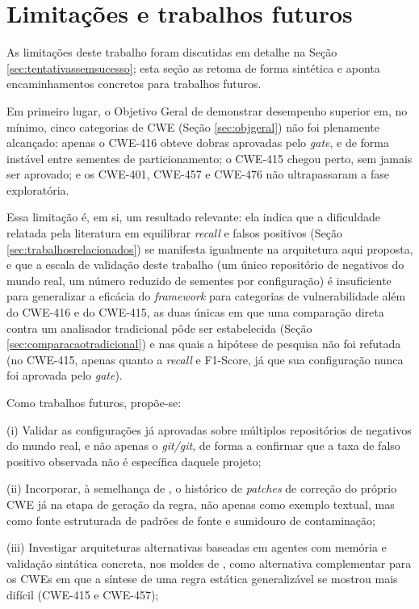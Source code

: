 \documentclass[
    12pt,                %
    openright,           %
    oneside,             %
    a4paper,             %
    english,             %
    brazil               %
]{abntex2}
\newcommand{\novo}[1]{{\color{red}#1}}
\begin{document}
\section{Limitações e trabalhos futuros}
\par
As limitações deste trabalho foram discutidas em detalhe na Seção \ref{sec:tentativassemsucesso}; esta seção as retoma de forma sintética e aponta encaminhamentos concretos para trabalhos futuros.
\par
Em primeiro lugar, o Objetivo Geral de demonstrar desempenho superior em, no mínimo, cinco categorias de CWE (Seção \ref{sec:objgeral}) não foi plenamente alcançado: apenas o CWE-416 obteve dobras aprovadas pelo \textit{gate}, e de forma instável entre sementes de particionamento; o CWE-415 chegou perto, sem jamais ser aprovado; e os CWE-401, CWE-457 e CWE-476 não ultrapassaram a fase exploratória.
\par
Essa limitação é, em si, um resultado relevante: ela indica que a dificuldade relatada pela literatura em equilibrar \textit{recall} e falsos positivos (Seção \ref{sec:trabalhosrelacionados}) se manifesta igualmente na arquitetura aqui proposta, e que a escala de validação deste trabalho (um único repositório de negativos do mundo real, um número reduzido de sementes por configuração) é insuficiente para generalizar a eficácia do \textit{framework} para categorias de vulnerabilidade além do CWE-416 e do CWE-415, as duas únicas em que uma comparação direta contra um analisador tradicional pôde ser estabelecida (Seção \ref{sec:comparacaotradicional}) e nas quais a hipótese de pesquisa não foi refutada\novo{ (no CWE-415, apenas quanto a \textit{recall} e F1-Score, já que sua configuração nunca foi aprovada pelo \textit{gate})}.
\par
Como trabalhos futuros, propõe-se: 
\par
(i) Validar as configurações já aprovadas sobre múltiplos repositórios de negativos do mundo real, e não apenas o \textit{git/git}, de forma a confirmar que a taxa de falso positivo observada não é específica daquele projeto; 
\par
(ii) Incorporar, à semelhança de , o histórico de \textit{patches} de correção do próprio CWE já na etapa de geração da regra, não apenas como exemplo textual, mas como fonte estruturada de padrões de fonte e sumidouro de contaminação; 
\par
(iii) Investigar arquiteturas alternativas baseadas em agentes com memória e validação sintática concreta, nos moldes de , como alternativa complementar para os CWEs em que a síntese de uma regra estática generalizável se mostrou mais difícil (CWE-415 e CWE-457); 
\end{document}
